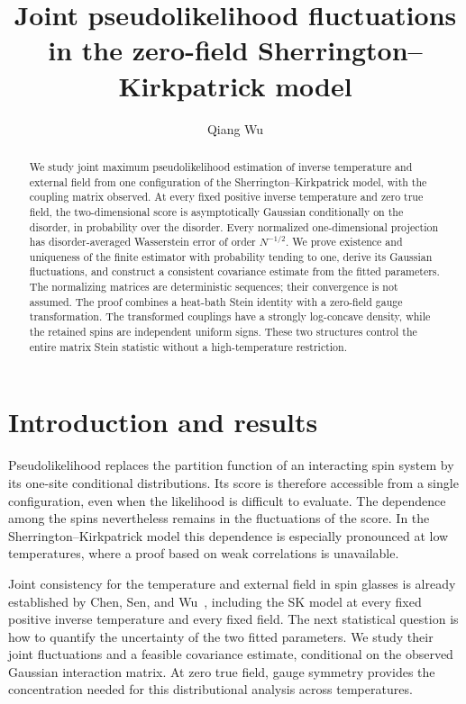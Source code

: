 \documentclass[11pt]{amsart}
\title[Joint pseudolikelihood fluctuations in the SK model]{Joint pseudolikelihood fluctuations in the zero-field Sherrington--Kirkpatrick model}
\author{Qiang Wu}
\date{}
\numberwithin{equation}{section}
\theoremstyle{remark}
\begin{document}
\begin{abstract}
We study joint maximum pseudolikelihood estimation of inverse temperature and external field from one configuration of the Sherrington--Kirkpatrick model, with the coupling matrix observed. At every fixed positive inverse temperature and zero true field, the two-dimensional score is asymptotically Gaussian conditionally on the disorder, in probability over the disorder. Every normalized one-dimensional projection has disorder-averaged Wasserstein error of order $N^{-1/2}$. We prove existence and uniqueness of the finite estimator with probability tending to one, derive its Gaussian fluctuations, and construct a consistent covariance estimate from the fitted parameters. The normalizing matrices are deterministic sequences; their convergence is not assumed. The proof combines a heat-bath Stein identity with a zero-field gauge transformation. The transformed couplings have a strongly log-concave density, while the retained spins are independent uniform signs. These two structures control the entire matrix Stein statistic without a high-temperature restriction.
\end{abstract}
\maketitle

\section{Introduction and results}

Pseudolikelihood replaces the partition function of an interacting spin system by its one-site conditional distributions. Its score is therefore accessible from a single configuration, even when the likelihood is difficult to evaluate. The dependence among the spins nevertheless remains in the fluctuations of the score. In the Sherrington--Kirkpatrick model this dependence is especially pronounced at low temperatures, where a proof based on weak correlations is unavailable.

Joint consistency for the temperature and external field in spin glasses is already established by Chen, Sen, and Wu~\cite{ChenSenWu2024}, including the SK model at every fixed positive inverse temperature and every fixed field. The next statistical question is how to quantify the uncertainty of the two fitted parameters. We study their joint fluctuations and a feasible covariance estimate, conditional on the observed Gaussian interaction matrix. At zero true field, gauge symmetry provides the concentration needed for this distributional analysis across temperatures.
\end{document}
